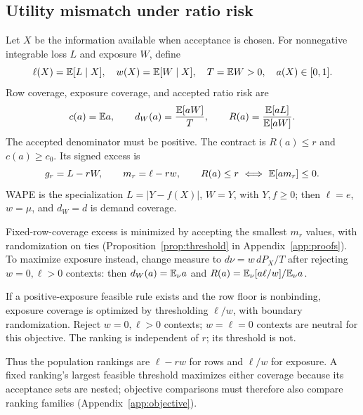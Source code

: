 \subsection{Utility mismatch under ratio risk}
Let $X$ be the information available when acceptance is chosen. For
nonnegative integrable loss $L$ and exposure $W$, define
\[
 \ell(X)=\mathbb{E}[L\mid X],\quad w(X)=\mathbb{E}[W\mid X],\quad T=\mathbb{E} W>0,
 \quad a(X)\in[0,1].
\]
Row coverage, exposure coverage, and accepted ratio risk are
\begin{equation}
 c(a)=\mathbb{E} a,\qquad d_W(a)=\frac{\mathbb{E}[aW]}{T},\qquad
 R(a)=\frac{\mathbb{E}[aL]}{\mathbb{E}[aW]}.
 \label{eq:ratio}
\end{equation}
The accepted denominator must be positive. The contract is $R(a)\leq r$
and $c(a)\geq c_0$. Its signed excess is
\begin{equation}
 g_r=L-rW,\qquad m_r=\ell-rw,\qquad
 R(a)\leq r\ \Longleftrightarrow\ \mathbb{E}[a m_r]\leq0.
 \label{eq:excess}
\end{equation}
WAPE is the specialization $L=|Y-f(X)|$, $W=Y$, with $Y,f\geq0$;
then $\ell=e$, $w=\mu$, and $d_W=d$ is demand coverage.

Fixed-row-coverage excess is minimized by accepting the smallest
$m_r$ values, with randomization on ties (Proposition~\ref{prop:threshold}
in Appendix~\ref{app:proofs}). To maximize exposure instead, change measure
to $d\nu=w\,dP_X/T$ after rejecting $w=0,\ell>0$ contexts: then $d_W(a)=\mathbb{E}_\nu a$ and
$R(a)=\mathbb{E}_\nu[a\ell/w]/\mathbb{E}_\nu a$.
\setcounter{proposition}{1}
\begin{proposition}
\label{prop:weighted}
If a positive-exposure feasible rule exists and the row floor is
nonbinding, exposure coverage is optimized by thresholding $\ell/w$,
with boundary randomization. Reject $w=0,\ell>0$ contexts; $w=\ell=0$
contexts are neutral for this objective. The ranking is independent of
$r$; its threshold is not.
\end{proposition}
Thus the population rankings are $\ell-rw$ for rows and $\ell/w$ for
exposure. A fixed ranking's largest feasible threshold maximizes either
coverage because its acceptance sets are nested; objective comparisons
must therefore also compare ranking families (Appendix~\ref{app:objective}).

